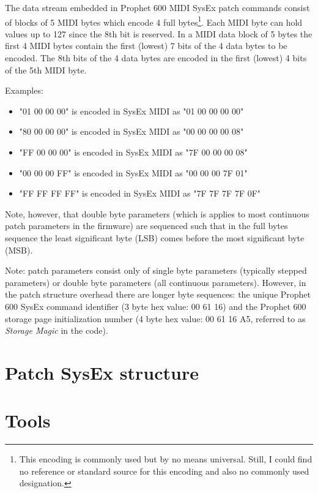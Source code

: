 \documentclass[landscape, 11pt, oneside]{report}
\begin{document}
The data stream embedded in Prophet 600 MIDI SysEx patch commands consist of blocks of 5 MIDI bytes which encode 4 full bytes\footnote{This encoding is commonly used but by no means universal. Still, I could find no reference or standard source for this encoding and also no commonly used designation.}. Each MIDI byte can hold values up to 127 since the 8th bit is reserved. In a MIDI data block of 5 bytes the first 4 MIDI bytes contain the first (lowest) 7 bits of the 4 data bytes to be encoded. The 8th bits of the 4 data bytes are encoded in the first (lowest) 4 bits of the 5th MIDI byte.   

Examples:

\begin{itemize}
  \item "01 00 00 00" is encoded in SysEx MIDI as "01 00 00 00 00"
  \item "80 00 00 00" is encoded in SysEx MIDI as "00 00 00 00 08"
  \item "FF 00 00 00" is encoded in SysEx MIDI as "7F 00 00 00 08"
  \item "00 00 00 FF" is encoded in SysEx MIDI as "00 00 00 7F 01"
  \item "FF FF FF FF" is encoded in SysEx MIDI as "7F 7F 7F 7F 0F"
\end{itemize}
 
Note, however, that double byte parameters (which is applies to most continuous patch parameters in the firmware) are sequenced such that in the full bytes sequence the least significant byte (LSB) comes before the most significant byte (MSB). 

Note: patch parameters  consist only of single byte parameters (typically stepped parameters) or double byte parameters (all continuous parameters). However, in the patch structure overhead there are longer byte sequences: the unique Prophet 600 SysEx command identifier (3 byte hex value: 00 61 16) and the Prophet 600 storage page initialization number (4 byte hex value: 00 61 16 A5, referred to as \textit{Storage Magic} in the code). 

\section{Patch SysEx structure}\label{sysexpatch}



\section{Tools}
\end{document}
